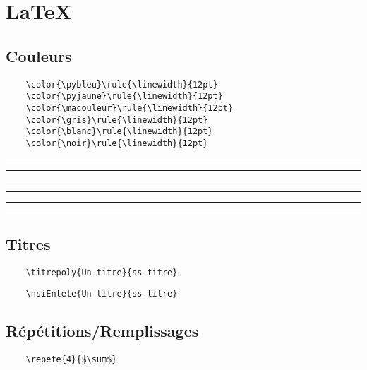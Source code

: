 \documentclass{article}
\begin{document}

  \section{\LaTeX}
  \subsection{Couleurs} 

  \begin{Verbatim}
    \color{\pybleu}\rule{\linewidth}{12pt}
    \color{\pyjaune}\rule{\linewidth}{12pt}
    \color{\macouleur}\rule{\linewidth}{12pt}
    \color{\gris}\rule{\linewidth}{12pt}
    \color{\blanc}\rule{\linewidth}{12pt}
    \color{\noir}\rule{\linewidth}{12pt}
  \end{Verbatim}


  \noindent\color{\pybleu}\rule{\linewidth}{12pt}
  \color{\pyjaune}\rule{\linewidth}{12pt}
  \color{\macouleur}\rule{\linewidth}{12pt}
  \color{\gris}\rule{\linewidth}{12pt}
  \color{\blanc}\rule{\linewidth}{12pt}
  \color{\noir}\rule{\linewidth}{12pt}

  \subsection{Titres}

  \begin{Verbatim}
    \titrepoly{Un titre}{ss-titre}
  \end{Verbatim}
  \begin{minipage}{\linewidth}
  \end{minipage}
  
  \begin{Verbatim}
    \nsiEntete{Un titre}{ss-titre}
  \end{Verbatim}
  \begin{minipage}{\linewidth}
  \end{minipage}

  \subsection{Répétitions/Remplissages}

  \begin{Verbatim}
    \repete{4}{$\sum$}
  \end{Verbatim}
  \begin{minipage}{\linewidth}
  \end{minipage}
  
\end{document}
